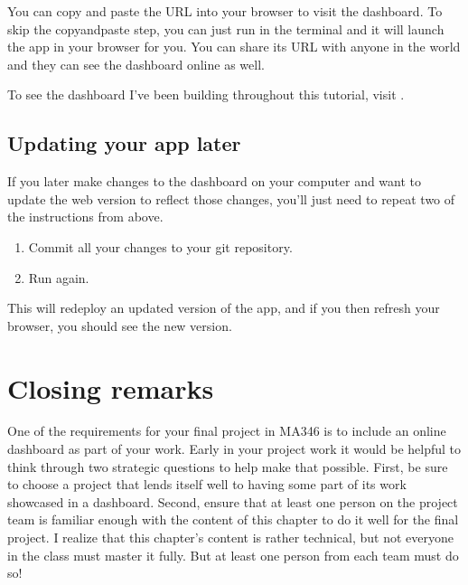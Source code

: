 \documentclass[letterpaper,10pt,english]{sphinxmanual}
\begin{document}
You can copy and paste the  URL into your browser to visit the dashboard.  To skip the copy\sphinxhyphen{}and\sphinxhyphen{}paste step, you can just run  in the terminal and it will launch the app in your browser for you.  You can share its URL with anyone in the world and they can see the dashboard online as well.

To see the dashboard I’ve been building throughout this tutorial, visit .


\subsection{Updating your app later}
\label{\detokenize{chapter-14-dashboards:updating-your-app-later}}
If you later make changes to the dashboard on your computer and want to update the web version to reflect those changes, you’ll just need to repeat two of the instructions from above.
\begin{enumerate}
%
\item {} 
Commit all your changes to your git repository.

\item {} 
Run  again.

\end{enumerate}

This will re\sphinxhyphen{}deploy an updated version of the app, and if you then refresh your browser, you should see the new version.


\section{Closing remarks}
\label{\detokenize{chapter-14-dashboards:closing-remarks}}
One of the requirements for your final project in MA346 is to include an online dashboard as part of your work.  Early in your project work it would be helpful to think through two strategic questions to help make that possible.  First, be sure to choose a project that lends itself well to having some part of its work showcased in a dashboard.  Second, ensure that at least one person on the project team is familiar enough with the content of this chapter to do it well for the final project.  I realize that this chapter’s content is rather technical, but not everyone in the class must master it fully.  But at least one person from each team must do so!
\end{document}

